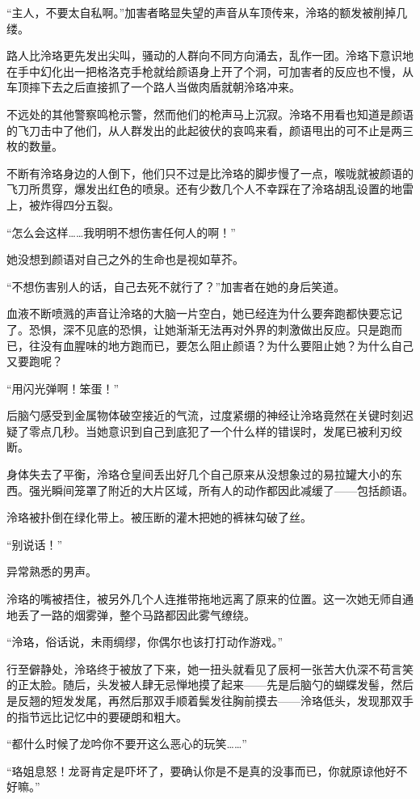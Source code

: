 \documentclass[UTF8, scheme = chinese, openany]{ctexbook}
\begin{document}
“主人，不要太自私啊。”加害者略显失望的声音从车顶传来，泠珞的额发被削掉几缕。

路人比泠珞更先发出尖叫，骚动的人群向不同方向涌去，乱作一团。泠珞下意识地在手中幻化出一把格洛克手枪就给颜语身上开了个洞，可加害者的反应也不慢，从车顶摔下去之后直接抓了一个路人当做肉盾就朝泠珞冲来。

不远处的其他警察鸣枪示警，然而他们的枪声马上沉寂。泠珞不用看也知道是颜语的飞刀击中了他们，从人群发出的此起彼伏的哀鸣来看，颜语甩出的可不止是两三枚的数量。

不断有泠珞身边的人倒下，他们只不过是比泠珞的脚步慢了一点，喉咙就被颜语的飞刀所贯穿，爆发出红色的喷泉。还有少数几个人不幸踩在了泠珞胡乱设置的地雷上，被炸得四分五裂。

“怎么会这样……我明明不想伤害任何人的啊！”

她没想到颜语对自己之外的生命也是视如草芥。

“不想伤害别人的话，自己去死不就行了？”加害者在她的身后笑道。

血液不断喷溅的声音让泠珞的大脑一片空白，她已经连为什么要奔跑都快要忘记了。恐惧，深不见底的恐惧，让她渐渐无法再对外界的刺激做出反应。只是跑而已，往没有血腥味的地方跑而已，要怎么阻止颜语？为什么要阻止她？为什么自己又要跑呢？

“用闪光弹啊！笨蛋！”

后脑勺感受到金属物体破空接近的气流，过度紧绷的神经让泠珞竟然在关键时刻迟疑了零点几秒。当她意识到自己到底犯了一个什么样的错误时，发尾已被利刃绞断。

身体失去了平衡，泠珞仓皇间丢出好几个自己原来从没想象过的易拉罐大小的东西。强光瞬间笼罩了附近的大片区域，所有人的动作都因此减缓了——包括颜语。

泠珞被扑倒在绿化带上。被压断的灌木把她的裤袜勾破了丝。

“别说话！”

异常熟悉的男声。

泠珞的嘴被捂住，被另外几个人连推带拖地远离了原来的位置。这一次她无师自通地丢了一路的烟雾弹，整个马路都因此雾气缭绕。

“泠珞，俗话说，未雨绸缪，你偶尔也该打打动作游戏。”

行至僻静处，泠珞终于被放了下来，她一扭头就看见了辰柯一张苦大仇深不苟言笑的正太脸。随后，头发被人肆无忌惮地摸了起来——先是后脑勺的蝴蝶发髻，然后是反翘的短发发尾，再然后那双手顺着鬓发往胸前摸去——泠珞低头，发现那双手的指节远比记忆中的要硬朗和粗大。

“都什么时候了龙吟你不要开这么恶心的玩笑……”

“珞姐息怒！龙哥肯定是吓坏了，要确认你是不是真的没事而已，你就原谅他好不好嘛。”
\end{document}

